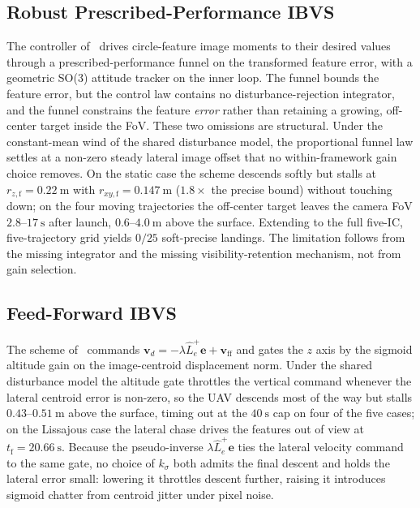 \documentclass{IEEEtaes}
\begin{document}
\subsection{Robust Prescribed-Performance IBVS \cite{lin2023}}
The controller of~\cite{lin2023} drives circle-feature image moments to their desired values through a prescribed-performance funnel on the transformed feature error, with a geometric SO(3) attitude tracker on the inner loop. The funnel bounds the feature error, but the control law contains no disturbance-rejection integrator, and the funnel constrains the feature \emph{error} rather than retaining a growing, off-center target inside the FoV. These two omissions are structural. Under the constant-mean wind of the shared disturbance model, the proportional funnel law settles at a non-zero steady lateral image offset that no within-framework gain choice removes. On the static case the scheme descends softly but stalls at $r_{z,\text{f}}=0.22~\text{m}$ with $r_{xy,\text{f}}=0.147~\text{m}$ ($1.8\times$ the precise bound) without touching down; on the four moving trajectories the off-center target leaves the camera FoV $2.8$--$17~\text{s}$ after launch, $0.6$--$4.0~\text{m}$ above the surface. Extending to the full five-IC, five-trajectory grid yields $0/25$ soft-precise landings. The limitation follows from the missing integrator and the missing visibility-retention mechanism, not from gain selection.

\subsection{Feed-Forward IBVS \cite{cho2022}}
The scheme of~\cite{cho2022} commands $\boldsymbol{v}_d=-\lambda\hat{L}_e^+\boldsymbol{e}+\boldsymbol{v}_{\text{ff}}$ and gates the $z$ axis by the sigmoid altitude gain on the image-centroid displacement norm. Under the shared disturbance model the altitude gate throttles the vertical command whenever the lateral centroid error is non-zero, so the UAV descends most of the way but stalls $0.43$--$0.51~\text{m}$ above the surface, timing out at the $40~\text{s}$ cap on four of the five cases; on the Lissajous case the lateral chase drives the features out of view at $t_\text{f}=20.66~\text{s}$. Because the pseudo-inverse $\lambda\hat{L}_e^+\boldsymbol{e}$ ties the lateral velocity command to the same gate, no choice of $k_\sigma$ both admits the final descent and holds the lateral error small: lowering it throttles descent further, raising it introduces sigmoid chatter from centroid jitter under pixel noise.
\end{document}
